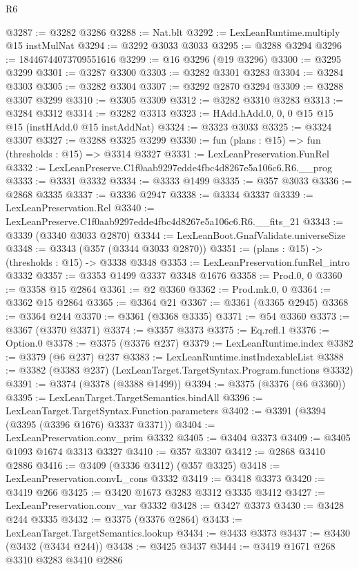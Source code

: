 \begin{lexlean}{R6}
\begin{coremodule}
{{{{{{{{{{{{{{{{{{{@3287 := @3282 @3286
@3288 := Nat.blt
@3292 := LexLeanRuntime.multiply @15 instMulNat
@3294 := @3292 @3033 @3033
@3295 := @3288 @3294
@3296 := 18446744073709551616
@3299 := @16 @3296 (@19 @3296)
@3300 := @3295 @3299
@3301 := @3287 @3300
@3303 := @3282 @3301 @3283
@3304 := @3284 @3303
@3305 := @3282 @3304
@3307 := @3292 @2870 @3294
@3309 := @3288 @3307 @3299
@3310 := @3305 @3309
@3312 := @3282 @3310 @3283
@3313 := @3284 @3312
@3314 := @3282 @3313
@3323 := HAdd.hAdd.{0, 0, 0} @15 @15 @15 (instHAdd.{0} @15 instAddNat)
@3324 := @3323 @3033
@3325 := @3324 @3307
@3327 := @3288 @3325 @3299
@3330 := fun (plans : @15) => fun (thresholds : @15) => @3314 @3327
@3331 := LexLeanPreservation.FunRel
@3332 := LexLeanPreserve.C1f0aab9297edde4fbc4d8267e5a106c6.R6.__prog
@3333 := @3331 @3332
@3334 := @3333 @1499
@3335 := @357 @3033
@3336 := @2868 @3335
@3337 := @3336 @2947
@3338 := @3334 @3337
@3339 := LexLeanPreservation.Rel
@3340 := LexLeanPreserve.C1f0aab9297edde4fbc4d8267e5a106c6.R6.__fits_21
@3343 := @3339 (@3340 @3033 @2870)
@3344 := LexLeanBoot.GnafValidate.universeSize
@3348 := @3343 (@357 (@3344 @3033 @2870))
@3351 := (plans : @15) -> (thresholds : @15) -> @3338 @3348
@3353 := LexLeanPreservation.funRel_intro @3332
@3357 := @3353 @1499 @3337 @3348 @1676
@3358 := Prod.{0, 0}
@3360 := @3358 @15 @2864
@3361 := @2 @3360
@3362 := Prod.mk.{0, 0}
@3364 := @3362 @15 @2864
@3365 := @3364 @21
@3367 := @3361 (@3365 @2945)
@3368 := @3364 @244
@3370 := @3361 (@3368 @3335)
@3371 := @54 @3360
@3373 := @3367 (@3370 @3371)
@3374 := @3357 @3373
@3375 := Eq.refl.{1}
@3376 := Option.{0}
@3378 := @3375 (@3376 @237)
@3379 := LexLeanRuntime.index
@3382 := @3379 (@6 @237) @237
@3383 := LexLeanRuntime.instIndexableList
@3388 := @3382 (@3383 @237) (LexLeanTarget.TargetSyntax.Program.functions @3332)
@3391 := @3374 (@3378 (@3388 @1499))
@3394 := @3375 (@3376 (@6 @3360))
@3395 := LexLeanTarget.TargetSemantics.bindAll
@3396 := LexLeanTarget.TargetSyntax.Function.parameters
@3402 := @3391 (@3394 (@3395 (@3396 @1676) @3337 @3371))
@3404 := LexLeanPreservation.conv_prim @3332
@3405 := @3404 @3373
@3409 := @3405 @1093 @1674 @3313 @3327
@3410 := @357 @3307
@3412 := @2868 @3410 @2886
@3416 := @3409 (@3336 @3412) (@357 @3325)
@3418 := LexLeanPreservation.convL_cons @3332
@3419 := @3418 @3373
@3420 := @3419 @266
@3425 := @3420 @1673 @3283 @3312 @3335 @3412
@3427 := LexLeanPreservation.conv_var @3332
@3428 := @3427 @3373
@3430 := @3428 @244 @3335
@3432 := @3375 (@3376 @2864)
@3433 := LexLeanTarget.TargetSemantics.lookup
@3434 := @3433 @3373
@3437 := @3430 (@3432 (@3434 @244))
@3438 := @3425 @3437
@3444 := @3419 @1671 @268 @3310 @3283 @3410 @2886
}}}}}}}}}}}}}}}}}}}
\end{coremodule}
\end{lexlean}
